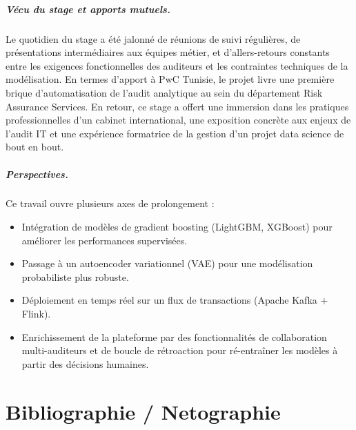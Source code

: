 \documentclass[12pt,a4paper,twoside]{report}
\begin{document}
\paragraph{Vécu du stage et apports mutuels.} Le quotidien du stage a été jalonné de réunions de suivi régulières, de présentations intermédiaires aux équipes métier, et d'allers-retours constants entre les exigences fonctionnelles des auditeurs et les contraintes techniques de la modélisation. En termes d'apport à PwC Tunisie, le projet livre une première brique d'automatisation de l'audit analytique au sein du département Risk Assurance Services. En retour, ce stage a offert une immersion dans les pratiques professionnelles d'un cabinet international, une exposition concrète aux enjeux de l'audit IT et une expérience formatrice de la gestion d'un projet data science de bout en bout.

\paragraph{Perspectives.} Ce travail ouvre plusieurs axes de prolongement :
\begin{itemize}
  \item Intégration de modèles de gradient boosting (LightGBM, XGBoost) pour améliorer les performances supervisées.
  \item Passage à un autoencoder variationnel (VAE) pour une modélisation probabiliste plus robuste.
  \item Déploiement en temps réel sur un flux de transactions (Apache Kafka + Flink).
  \item Enrichissement de la plateforme par des fonctionnalités de collaboration multi-auditeurs et de boucle de rétroaction pour ré-entraîner les modèles à partir des décisions humaines.
\end{itemize}

\chapter*{Bibliographie / Netographie}
\end{document}
